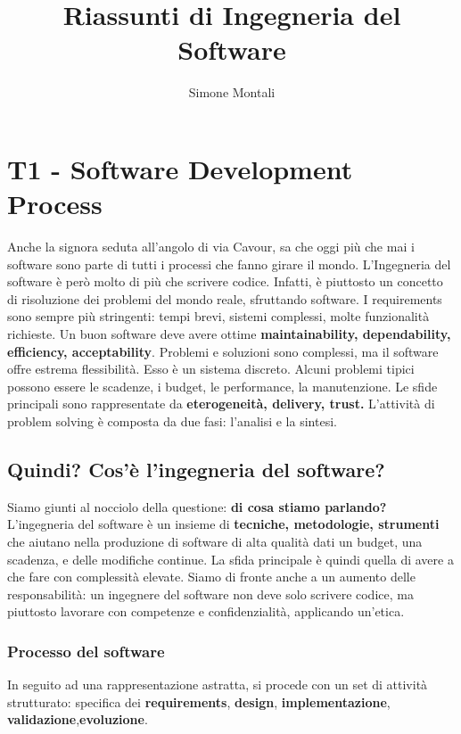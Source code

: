 \documentclass[11pt]{article}
\begin{document}
\author{Simone Montali}
\title{Riassunti di Ingegneria del Software}

\maketitle

\medskip

\section{T1 - Software Development Process}
Anche la signora seduta all'angolo di via Cavour, sa che oggi più che mai i software sono parte di tutti i processi che fanno girare il mondo. L'Ingegneria del software è però molto di più che scrivere codice. Infatti, è piuttosto un concetto di risoluzione dei problemi del mondo reale, sfruttando software. I requirements sono sempre più stringenti: tempi brevi, sistemi complessi, molte funzionalità richieste. Un buon software deve avere ottime \textbf{maintainability, dependability, efficiency, acceptability}. Problemi e soluzioni sono complessi, ma il software offre estrema flessibilità. Esso è un sistema discreto. Alcuni problemi tipici possono essere le scadenze, i budget, le performance, la manutenzione. Le sfide principali sono rappresentate da \textbf{eterogeneità, delivery, trust.} L'attività di problem solving è composta da due fasi: l'analisi e la sintesi. 
\subsection{Quindi? Cos'è l'ingegneria del software?}
Siamo giunti al nocciolo della questione: \textbf{di cosa stiamo parlando?} L'ingegneria del software è un insieme di \textbf{tecniche, metodologie, strumenti} che aiutano nella produzione di software di alta qualità dati un budget, una scadenza, e delle modifiche continue. La sfida principale è quindi quella di avere a che fare con complessità elevate. 
Siamo di fronte anche a un aumento delle responsabilità: un ingegnere del software non deve solo scrivere codice, ma piuttosto lavorare con competenze e confidenzialità, applicando un'etica.
\subsubsection{Processo del software}
In seguito ad una rappresentazione astratta, si procede con un set di attività strutturato: specifica dei \textbf{requirements}, \textbf{design}, \textbf{implementazione}, \textbf{validazione},\textbf{evoluzione}. 
\end{document}
